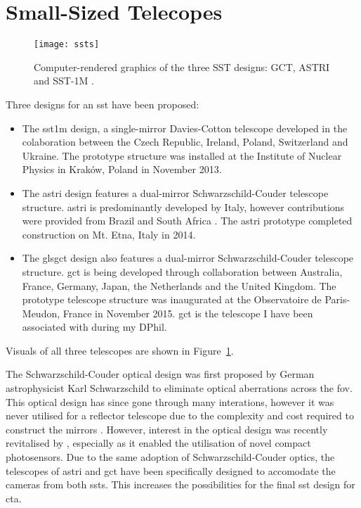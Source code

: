 \section{Small-Sized Telecopes}

\begin{figure}
	\centering\texttt{[image: ssts]} 
	\caption[The three SST designs.]{Computer-rendered graphics of the three SST designs: GCT, ASTRI and SST-1M \cite{cta-sst}.}
	\label{fig:ssts}
\end{figure}

Three designs for an \gls{sst} have been proposed:
\begin{itemize}
\item The \gls{sst1m} design, a single-mirror Davies-Cotton telescope developed in the colaboration between the Czech Republic, Ireland, Poland, Switzerland and Ukraine. The prototype structure was installed at the Institute of Nuclear Physics in Kraków, Poland in November 2013.
\item The \gls{astri} design features a dual-mirror Schwarzschild-Couder telescope structure. \gls{astri} is predominantly developed by Italy, however contributions were provided from Brazil and South Africa \cite{cta-sst}. The \gls{astri} prototype completed construction on Mt. Etna, Italy in 2014.
\item The gls{gct} design also features a dual-mirror Schwarzschild-Couder telescope structure. \gls{gct} is being developed through collaboration between Australia, France, Germany, Japan, the Netherlands and the United Kingdom. The prototype telescope structure was inaugurated at the Observatoire de Paris-Meudon, France in November 2015. \gls{gct} is the telescope I have been associated with during my DPhil.
\end{itemize}
Visuals of all three telescopes are shown in Figure~\ref{fig:ssts}.

The Schwarzschild-Couder optical design was first proposed by German astrophysicist Karl Schwarzschild to eliminate optical aberrations across the \gls{fov}. This optical design has since gone through many interations, however it was never utilised for a reflector telescope due to the complexity and cost required to construct the mirrors \cite{Giro2017}. However, interest in the optical design was recently revitalised by \textcite{Vassiliev2007}, especially as it enabled the utilisation of novel compact photosensors. Due to the same adoption of Schwarzschild-Couder optics, the telescopes of \gls{astri} and \gls{gct} have been specifically designed to accomodate the cameras from both \glspl{sst}. This increases the possibilities for the final \gls{sst} design for \gls{cta}.


